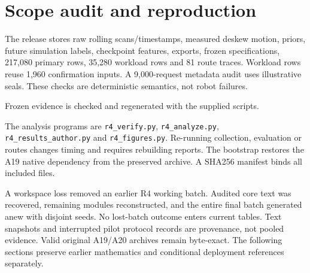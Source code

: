 \FloatBarrier

\section{Scope audit and reproduction}
The release stores raw rolling scans/timestamps, measured deskew motion, priors, future simulation labels, checkpoint features, exports, frozen specifications, 217,080 primary rows, 35,280 workload rows and 81 route traces. Workload rows reuse 1,960 confirmation inputs. A 9,000-request metadata audit uses illustrative seals. These checks are deterministic semantics, not robot failures.

Frozen evidence is checked and regenerated with the supplied scripts.\par
The analysis programs are \texttt{r4\_verify.py}, \texttt{r4\_analyze.py}, \texttt{r4\_\allowbreak results\_\allowbreak author.py} and \texttt{r4\_figures.py}. Re-running collection, evaluation or routes changes timing and requires rebuilding reports. The bootstrap restores the A19 native dependency from the preserved archive. A SHA256 manifest binds all included files.

A workspace loss removed an earlier R4 working batch. Audited core text was recovered, remaining modules reconstructed, and the entire final batch generated anew with disjoint seeds. No lost-batch outcome enters current tables. Text snapshots and interrupted pilot protocol records are provenance, not pooled evidence. Valid original A19/A20 archives remain byte-exact. The following sections preserve earlier mathematics and conditional deployment references separately.
\FloatBarrier
